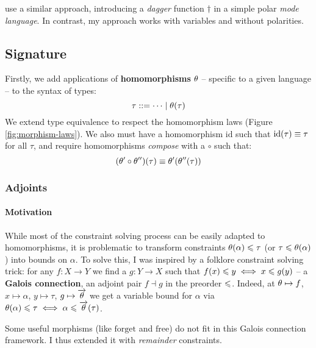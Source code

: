 \textcite{oxcaml} use a similar approach, introducing a \emph{dagger} function $\dagger$ in a simple polar \emph{mode language}. In contrast, my approach works with variables and without polarities.

\subsection{Signature}
\label{subsec:signature-morphisms}

Firstly, we add applications of \textbf{homomorphisms} $\theta$ -- specific to a given language -- to the syntax of types:
$$ \tau ::= \cdots \mid \theta(\tau) $$
We extend type equivalence to respect the homomorphism laws (Figure \ref{fig:morphism-laws}). We also must have a homomorphism $\mathrm{id}$ such that $\mathrm{id}(\tau) \equiv \tau$ for all $\tau$, and require homomorphisms \emph{compose} with a $\circ$ such that: $$\left( \morph' \circ \morph'' \right)(\tau) \equiv \morph'\left( \morph''(\tau) \right)$$

\subsubsection{Adjoints}

\paragraph{Motivation}
While most of the constraint solving process can be easily adapted to homomorphisms, it is problematic to transform constraints $\theta(\alpha) \leqslant \tau$ (or $\tau \leqslant \theta(\alpha)$) into bounds on $\alpha$. 
To solve this, I was inspired by a folklore constraint solving trick: for any $f : X \to Y$ we find a $g : Y \to X$ such that $f(x) \leqslant y \iff x \leqslant g(y)$ -- a \textbf{Galois connection}, \ie{} an adjoint pair $f \dashv g$ in the preorder $\leqslant$. Indeed, at $\theta \mapsto f$, $x \mapsto \alpha$, $y \mapsto \tau$, $g \mapsto \overrightarrow{\theta}$ we get a variable bound for $\alpha$ via $\theta(\alpha) \leqslant \tau \iff \alpha \leqslant \overrightarrow{\theta}(\tau)$.

Some useful morphisms (like $\mathrm{forget}$ and $\mathrm{free}$) do not fit in this Galois connection framework. I thus extended it with \emph{remainder} constraints.

